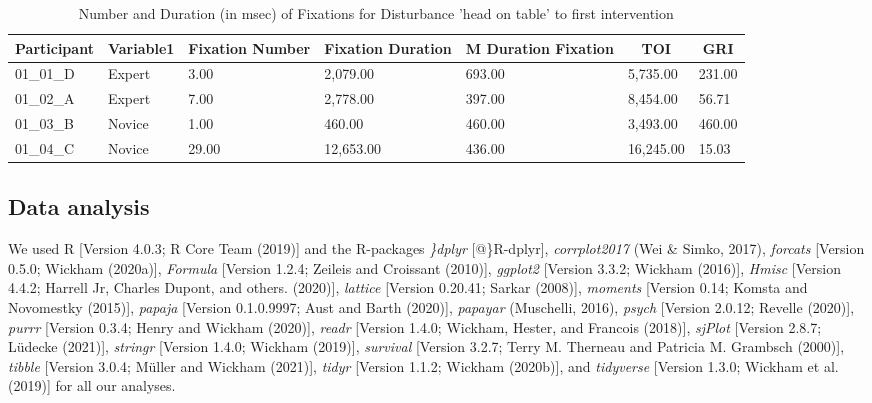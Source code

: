 \documentclass[
  english,
  man,floatsintext]{apa6}
\begin{document}
\begin{table}[h]

\begin{center}
\begin{threeparttable}

\caption{\label{tab:Disturbance "head on table" to first intervention}Number and Duration (in msec) of Fixations for Disturbance 'head on table' to first intervention}

\scriptsize{

\begin{tabular}{lllllll}
\toprule
Participant & \multicolumn{1}{c}{Variable1} & \multicolumn{1}{c}{Fixation Number} & \multicolumn{1}{c}{Fixation Duration} & \multicolumn{1}{c}{M Duration Fixation} & \multicolumn{1}{c}{TOI} & \multicolumn{1}{c}{GRI}\\
\midrule
01\_01\_D & Expert & 3.00 & 2,079.00 & 693.00 & 5,735.00 & 231.00\\
01\_02\_A & Expert & 7.00 & 2,778.00 & 397.00 & 8,454.00 & 56.71\\
01\_03\_B & Novice & 1.00 & 460.00 & 460.00 & 3,493.00 & 460.00\\
01\_04\_C & Novice & 29.00 & 12,653.00 & 436.00 & 16,245.00 & 15.03\\
\bottomrule
\end{tabular}

}

\end{threeparttable}
\end{center}

\end{table}

\hypertarget{data-analysis}{%
\subsection{Data analysis}\label{data-analysis}}

We used R {[}Version 4.0.3; R Core Team (2019){]} and the R-packages \emph{\}dplyr} {[}@\}R-dplyr{]}, \emph{corrplot2017} (Wei \& Simko, 2017), \emph{forcats} {[}Version 0.5.0; Wickham (2020a){]}, \emph{Formula} {[}Version 1.2.4; Zeileis and Croissant (2010){]}, \emph{ggplot2} {[}Version 3.3.2; Wickham (2016){]}, \emph{Hmisc} {[}Version 4.4.2; Harrell Jr, Charles Dupont, and others. (2020){]}, \emph{lattice} {[}Version 0.20.41; Sarkar (2008){]}, \emph{moments} {[}Version 0.14; Komsta and Novomestky (2015){]}, \emph{papaja} {[}Version 0.1.0.9997; Aust and Barth (2020){]}, \emph{papayar} (Muschelli, 2016), \emph{psych} {[}Version 2.0.12; Revelle (2020){]}, \emph{purrr} {[}Version 0.3.4; Henry and Wickham (2020){]}, \emph{readr} {[}Version 1.4.0; Wickham, Hester, and Francois (2018){]}, \emph{sjPlot} {[}Version 2.8.7; Lüdecke (2021){]}, \emph{stringr} {[}Version 1.4.0; Wickham (2019){]}, \emph{survival} {[}Version 3.2.7; Terry M. Therneau and Patricia M. Grambsch (2000){]}, \emph{tibble} {[}Version 3.0.4; Müller and Wickham (2021){]}, \emph{tidyr} {[}Version 1.1.2; Wickham (2020b){]}, and \emph{tidyverse} {[}Version 1.3.0; Wickham et al. (2019){]} for all our analyses.
\end{document}
